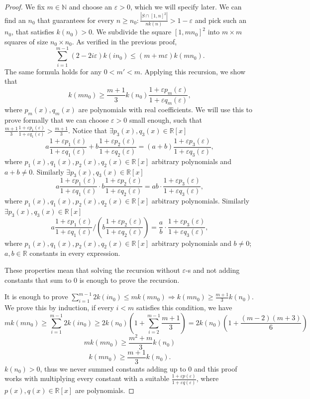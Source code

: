 \documentclass[11pt,a4paper]{article}
\numberwithin{equation}{section}
\newcommand{\nn}{\mathbb{N}}
\begin{document}
\begin{proof}

We fix $m\in\nn$ and choose an $\varepsilon>0$, which we will specify later. We can find an $n_0$ that guarantees for every $n \ge n_0: \frac{|S \cap [1,n]^2|}{n k(n)} >1-\varepsilon$ and pick such an $n_0$, that satisfies $k(n_0) > 0$.  We subdivide the square $[1, mn_0]^2$ into $m\times m$ squares of size $n_0\times n_0$. As verified in the previous proof, 
$$\sum_{i=1}^{m-1}(2-2i\varepsilon)k(in_0)\le (m+m\varepsilon)k(mn_0).$$
The same formula holds for any $0<m'<m$.
Applying this recursion, we show that $$k(mn_0)\ge\frac{m+1}{3}k(n_0)\frac{1+\varepsilon p_m(\varepsilon)}{1+\varepsilon q_m(\varepsilon)},$$ where $p_m(x),q_m(x)$  are polynomials with real coefficients. We will use this to prove formally that we can choose $\varepsilon>0$ small enough, such that $\frac{m+1}{3}\frac{1+\varepsilon p_1(\varepsilon)}{1+\varepsilon q_1(\varepsilon)}> \frac{m+1}{3}$. Notice that $\exists p_3(x),q_3(x)\in \mathbb{R}[x]$ 
$$a\frac{1+\varepsilon p_1(\varepsilon)}{1+\varepsilon q_1(\varepsilon)}+b\frac{1+\varepsilon p_2(\varepsilon)}{1+\varepsilon q_2(\varepsilon)}=(a+b)\frac{1+\varepsilon p_3(\varepsilon)}{1+\varepsilon q_3(\varepsilon)},$$
 where $p_1(x),q_1(x),p_2(x),q_2(x)\in \mathbb{R}[x]$ arbitrary polynomials and $a+b\ne0$. Similarly  $\exists p_3(x),q_3(x)\in \mathbb{R}[x]$ 
 $$a\frac{1+\varepsilon p_1(\varepsilon)}{1+\varepsilon q_1(\varepsilon)}\cdot b\frac{1+\varepsilon p_2(\varepsilon)}{1+\varepsilon q_2(\varepsilon)}=ab\cdot\frac{1+\varepsilon p_3(\varepsilon)}{1+\varepsilon q_3(\varepsilon)},$$ 
 where $p_1(x),q_1(x),p_2(x),q_2(x)\in \mathbb{R}[x]$ arbitrary polynomials. Similarly  $\exists p_3(x),q_3(x)\in \mathbb{R}[x]$ 
 $$a\frac{1+\varepsilon p_1(\varepsilon)}{1+\varepsilon q_1(\varepsilon)}/\left(b\frac{1+\varepsilon p_2(\varepsilon)}{1+\varepsilon q_2(\varepsilon)}\right)=\frac ab\cdot \frac{1+\varepsilon p_3(\varepsilon)}{1+\varepsilon q_3(\varepsilon)},$$ 
 where $p_1(x),q_1(x),p_2(x),q_2(x)\in \mathbb{R}[x]$ arbitrary polynomials and $b\ne0$; $a,b\in \mathbb{R}$ constants in every expression.

 These properties mean that solving the recursion without $\varepsilon$-s and not adding constants that sum to $0$ is enough to prove the recursion.

 It is enough to prove $\sum_{i=1}^{m-1}2k(in_0)\le mk(mn_0)\Rightarrow k(mn_0)\ge\frac{m+1}{3}k(n_0)$. We prove this by induction, if every $i<m$ satisfies this condition, we have 
 $$mk(mn_0)\ge\sum_{i=1}^{m-1}2k(in_0)\ge 2k(n_0)\left(1+\sum_{i=2}^{m-1}\frac{m+1}{3}\right)=2k(n_0)\left(1+\frac{(m-2)(m+3)}{6}\right)$$
 $$mk(mn_0)\ge\frac{m^2+m}{3}k(n_0)$$
 $$k(mn_0)\ge\frac{m+1}{3}k(n_0).$$
 $k(n_0)>0$, thus we never summed constants adding up to $0$ and this proof works with multiplying every constant with a suitable $\frac{1+\varepsilon p(\varepsilon)}{1+\varepsilon q(\varepsilon)}$, where $p(x),q(x)\in \mathbb{R}[x]$ are polynomials.


\end{proof}
\end{document}
